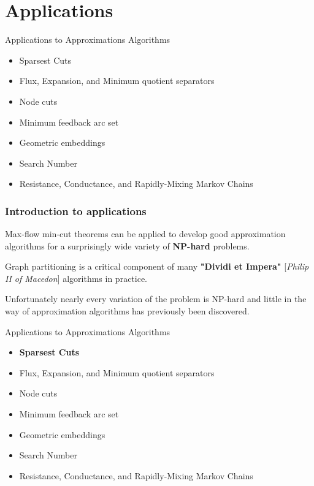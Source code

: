 
\setlength{\parskip}{\baselineskip} 
\section{Applications}
\begin{frame}[t]
\begin{block}{Applications to Approximations Algorithms}
	\begin{itemize}
			\item Sparsest Cuts
            \item Flux, Expansion, and Minimum quotient separators
            \item Node cuts
			\item Minimum feedback arc set
            \item Geometric embeddings
        	\item Search Number
            \item Resistance, Conductance, and Rapidly-Mixing Markov Chains
	 \end{itemize} 
\end{block}
\end{frame}


\begin{frame}
\frametitle{Introduction to applications}
Max-flow min-cut theorems can be applied to develop good approximation algorithms for a surprisingly wide variety of \textbf{NP-hard} problems. 

Graph partitioning is a critical component of many \textbf{"Dividi et Impera"} [\textit{Philip II of Macedon}] algorithms in practice. 

Unfortunately nearly every variation of the problem is NP-hard and little in the way of approximation algorithms has previously been discovered. 

\end{frame}


\begin{frame}[t]
\begin{block}{Applications to Approximations Algorithms}
	\begin{itemize}
			\item \textbf{Sparsest Cuts}
            \item Flux, Expansion, and Minimum quotient separators
            \item Node cuts
			\item Minimum feedback arc set
            \item Geometric embeddings
        	\item Search Number
            \item Resistance, Conductance, and Rapidly-Mixing Markov Chains
	 \end{itemize} 
\end{block}
\end{frame}

